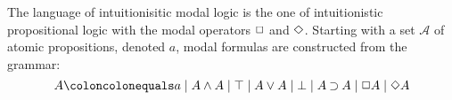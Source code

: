 \documentclass[twoside]{aiml18}
\begin{document}



The language of {intuitionisitic modal logic} is the one of intuitionistic propositional logic with the modal operators $\mathord{\Box}$ and $\mathord{\Diamond}$. %
%
Starting with a set $\mathcal{A}$ of atomic propositions, denoted $a$, modal formulas are constructed from the grammar:
%
$$
A \coloncolonequals
a \mid A \AND A \mid \TOP \mid A \OR A \mid \BOT \mid A \IMP A \mid \BOX A \mid \DIA A
$$
%

%
\end{document}
